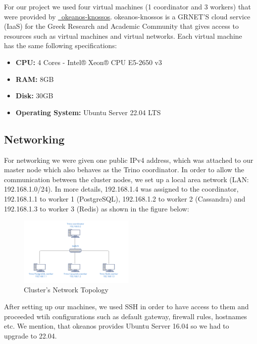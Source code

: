 \documentclass[conference]{IEEEtran}
\begin{document}
For our project we used four virtual machines (1 coordinator and 3 workers) that were provided by \textcolor{linkblue}{\underline{\href{https://okeanos-knossos.grnet.gr/home/}{~okeanos-knossos}}}.
okeanos-knossos is a GRNET'S cloud service (IaaS) for the Greek Research and Academic Community that gives access to resources such as 
virtual machines and virtual networks. Each virtual machine has the same following specifications:

\begin{itemize}
    \item \textbf{CPU:} 4 Cores - Intel® Xeon® CPU E5-2650 v3
    \item \textbf{RAM:} 8GB
    \item \textbf{Disk:} 30GB
    \item \textbf{Operating System:} Ubuntu Server 22.04 LTS
\end{itemize}

\subsection{Networking}

For networking we were given one public IPv4 address, which was attached to our master node which also behaves as the Trino coordinator.
In order to allow the communication between the cluster nodes, we set up a local area network (LAN: 192.168.1.0/24). In more details,
192.168.1.4 was assigned to the coordinator, 192.168.1.1 to worker 1 (PostgreSQL), 192.168.1.2 to worker 2 (Cassandra) and 192.168.1.3 to worker 3 (Redis)
as shown in the figure below:

\begin{figure}[h]
    \centering
    \includegraphics[width=0.5\textwidth]{images/LAN.png}
    \caption{Cluster's Network Topology}
    \label{fig:LAN}
\end{figure}

After setting up our machines, we used SSH in order to have access to them and proceeded wtih configurations 
such as default gateway, firewall rules, hostnames etc. We mention, that okeanos provides Ubuntu Server 16.04 so
we had to upgrade to 22.04. 
\end{document}
